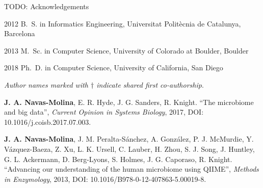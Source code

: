\begin{frontmatter}
\printglossary[title=List of Abbreviations,toctitle=List of Abbreviations,nonumberlist ]
\listoffigures  %
\listoftables   %

%
%
\begin{acknowledgements}
 TODO: Acknowledgements


\end{acknowledgements}


%
%
\begin{vitapage}
\begin{vita}
  \item[2012] B.~S. in Informatics Engineering, Universitat Polit\`ecnia de Catalunya, Barcelona
  \item[2013] M.~Sc. in Computer Science, University of Colorado at Boulder, Boulder
  \item[2018] Ph.~D. in Computer Science, University of California, San Diego
\end{vita}


\begin{publications}

    \item \textsl{Author names marked with $\dagger$ indicate shared first co-authorship}.

    \item \textbf{J. A. Navas-Molina}, E. R. Hyde, J. G. Sanders, R. Knight. ``The microbiome and big data'', \emph{Current Opinion in Systems Biology}, 2017, DOI: 10.1016/j.coisb.2017.07.003.

	\item \textbf{J. A. Navas-Molina}, J. M. Peralta-S\'anchez, A. Gonz\'alez, P. J. McMurdie, Y. V\'azquez-Baeza, Z. Xu, L. K. Ursell, C. Lauber, H. Zhou, S. J. Song, J. Huntley, G. L. Ackermann, D. Berg-Lyons, S. Holmes, J. G. Caporaso, R. Knight. ``Advancing our understanding of the human microbiome using QIIME'', \emph{Methods in Enzymology}, 2013, DOI: 10.1016/B978-0-12-407863-5.00019-8.


\end{publications}
\end{vitapage}
\end{frontmatter}
